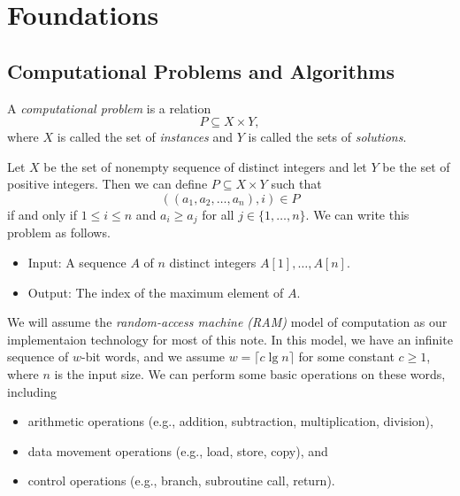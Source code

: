 \chapter{Foundations}
\section{Computational Problems and Algorithms}
\begin{definition}
  A \emph{computational problem} is a relation
  \begin{equation*}
    P \subseteq X \times Y,
  \end{equation*}
  where $X$ is called the set of \emph{instances} and $Y$ is called the sets of
  \emph{solutions}.
\end{definition}

\begin{example}
  Let $X$ be the set of nonempty sequence of distinct integers and let $Y$
  be the set of positive integers.
  Then we can define $P \subseteq X \times Y$ such that
  \begin{equation*}
    ((a_1, a_2, \dots, a_n), i) \in P
  \end{equation*}
  if and only if $1 \leq i \leq n$ and $a_i \geq a_j$ for all
  $j \in \{1, \dots, n\}$.
  We can write this problem as follows.
\end{example}
\begin{problem}
  \label{prob:champion}
  \leavevmode
  \begin{itemize}
    \item Input: A sequence $A$ of $n$ distinct integers $A[1], \dots, A[n]$.
    \item Output: The index of the maximum element of $A$.
  \end{itemize}
\end{problem}

\begin{definition}
  We will assume the \emph{random-access machine (RAM)} model of computation as
  our implementaion technology for most of this note.
  In this model, we have an infinite sequence of $w$-bit words, and we assume
  $w = \lceil c \lg n \rceil$ for some constant $c \geq 1$, where $n$ is the
  input size.
  We can perform some basic operations on these words, including
  \begin{itemize}
    \item arithmetic operations (e.g., addition, subtraction, multiplication,
    division),
    \item data movement operations (e.g., load, store, copy), and
    \item control operations (e.g., branch, subroutine call, return).
  \end{itemize}
\end{definition}

